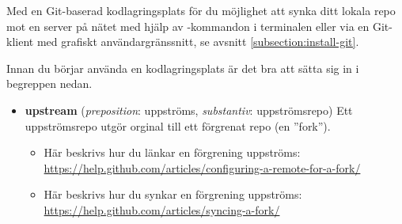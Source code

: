Med en Git-baserad kodlagringsplats för du möjlighet att synka ditt lokala repo mot en server på nätet med hjälp av -kommandon i terminalen eller via en Git-klient med grafiskt användargränssnitt, se avsnitt \ref{subsection:install-git}. 

Innan du börjar använda en kodlagringsplats är det bra att sätta sig in i begreppen nedan.

\begin{itemize}
 Genom att klona ett repo som ligger på en nätlagringsplats kan du bygga, undersöka och vidareutveckla koden lokalt på din dator. Om du har rättigheter att lämna in kod till det centrala orginalet kan du pusha dina commits direkt via terminalkommando eller Git-klient.

 Genom att förgrena ett repo skapar du en kopia, normalt även den nätlagrad på en kodlagringsplats, som du kan utveckla separat från orginalet. Det blir då möjligt för dig att lämna in ändringar och trycka upp dem, även om du inte har rättigheter att leverera (''pusha'') till originalet. Gör en ändringsbegäran (Pull Request, PR) om du vill bidra med dina ändringar, så kan ägaren av orginalet sedan välja att sammanfoga (''merga'') dina ändringar med orginalet. Många nätlagringsplatser, så som GitHub, har en speciell knapp som du trycker på för att enkelt skapa en fork av ett repo under din användare. 

\item \textbf{upstream} (\textit{preposition}: uppströms, \textit{substantiv}: uppströmsrepo) Ett uppströmsrepo utgör orginal till ett förgrenat repo (en ''fork''). 
\begin{itemize}[noitemsep,nolistsep]

\item Här beskrivs hur du länkar en förgrening uppströms: \\ 
{\small\url{https://help.github.com/articles/configuring-a-remote-for-a-fork/}}

\item Här beskrivs hur du synkar en förgrening uppströms:\\
{\small\url{https://help.github.com/articles/syncing-a-fork/}}

\end{itemize}

\end{itemize}

